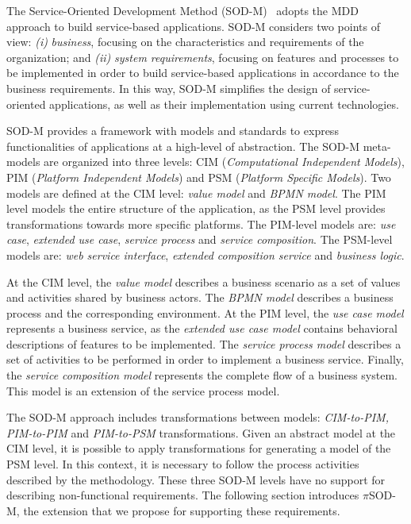 
The Service-Oriented Development Method (SOD-M)~\cite{decastro1}
adopts  the MDD approach to build service-based applications. SOD-M considers two points of view:
\textit{(i)} \textit{business}, focusing on the characteristics and requirements
of the organization; and 
\textit{(ii)} \textit{system requirements}, focusing on
features and processes to be implemented in order to build service-based applications in accordance to the business requirements. In
this way, SOD-M  simplifies the design of service-oriented applications, as
well as their implementation using current technologies.

SOD-M provides a framework with models and standards to express functionalities
of applications at a high-level of abstraction. The SOD-M meta-models are organized 
into three levels: CIM (\textit{Computational Independent Models}), 
PIM (\textit{Platform Independent Models}) and PSM (\textit{Platform Specific Models}).
Two models are defined at the CIM level: \textit{value model} 
and \textit{BPMN model}. 
The PIM level models the entire structure of the application, as
the PSM level provides transformations towards more specific platforms.
The PIM-level models are: \textit{use case}, \textit{extended use case}, \textit{service process} and
\textit{service composition}. The PSM-level models are: \textit{web service interface}, \textit{extended composition service} and \textit{business logic}. 
 
At the CIM level, the \textit{value model} describes a business
scenario as a set of values and activities shared by business actors. 
The \textit{BPMN model} describes a business process and the corresponding environment. 
At the PIM level, the \textit{use case model} represents
a business service, as the \textit{extended use case model} contains 
behavioral descriptions of features to be implemented. 
The \textit{service process model} describes a set of
activities to be performed in order to implement a business service.
Finally, the \textit{service composition model} represents the complete flow of a business system. 
This model is an extension of the service process model. 

The SOD-M approach includes transformations between models:
\textit{CIM-to-PIM, PIM-to-PIM} and \textit{PIM-to-PSM} transformations. Given
an abstract model at the CIM level, it is possible to apply transformations for
generating a model of the PSM level. In this context, it is necessary to
follow the process activities described by the methodology. 
%
These three SOD-M levels have no support for describing non-functional requirements. The following section introduces $\pi$SOD-M, the extension that we propose for supporting these requirements.



